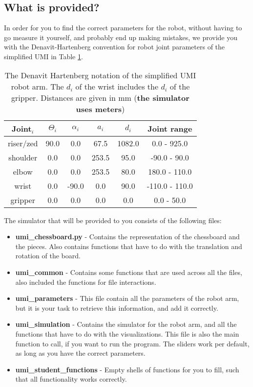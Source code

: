 \documentclass[10pt]{scrartcl}
\begin{document}
\subsection*{What is provided?}

In order for you to find the correct parameters for the robot, without having to go measure it yourself, and probably end up making mistakes, we provide you with the Denavit-Hartenberg convention for robot joint parameters of the simplified UMI in Table \ref{tab:denavit}.

\begin{table}[h!]
    \centering
    \begin{tabular}{|c|c|c|c|c|c|} \hline
        Joint$_i$ & $\Theta_i$ & $\alpha_i$ & $a_i$ & $d_i$ & Joint range \\ \hline
        riser/zed & 90.0 & 0.0 & 67.5 & 1082.0 & 0.0 - 925.0 \\ \hline
        shoulder & 0.0 & 0.0 & 253.5 & 95.0 & -90.0 - 90.0 \\ \hline
        elbow & 0.0 & 0.0 & 253.5 & 80.0 & 180.0 - 110.0 \\ \hline
        wrist & 0.0 & -90.0 & 0.0 & 90.0 & -110.0 - 110.0 \\ \hline
        gripper & 0.0 & 0.0 & 0.0 & 0.0 & 0.0 - 50.0 \\ \hline
    \end{tabular}
    \caption{The Denavit Hartenberg notation of the simplified UMI robot arm. The $d_i$ of the wrist includes the $d_i$ of the gripper. Distances are given in mm (\textbf{the simulator uses meters})}
    \label{tab:denavit}
\end{table}

The simulator that will be provided to you consists of the following files:
\begin{itemize}
    \item \textbf{umi\_chessboard.py} - Contains the representation of the chessboard and the pieces. Also contains functions that have to do with the translation and rotation of the board.
    \item \textbf{umi\_common} - Contains some functions that are used across all the files, also included the functions for file interactions.
    \item \textbf{umi\_parameters} - This file contain all the parameters of the robot arm, but it is your task to retrieve this information, and add it correctly.
    \item \textbf{umi\_simulation} - Contains the simulator for the robot arm, and all the functions that have to do with the visualizations. This file is also the main function to call, if you want to run the program. The sliders work per default, as long as you have the correct parameters.
    \item \textbf{umi\_student\_functions} - Empty shells of functions for you to fill, such that all functionality works correctly.
\end{itemize}
\end{document}
